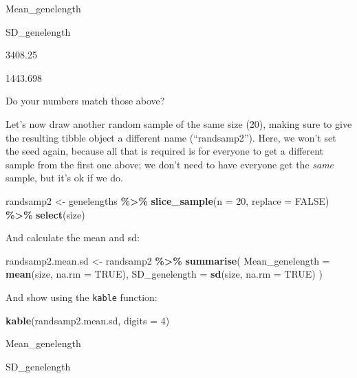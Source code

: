 \documentclass[
]{book}
\newenvironment{Shaded}{\begin{snugshade}}{\end{snugshade}}
\newcommand{\AttributeTok}[1]{\textcolor[rgb]{0.13,0.29,0.53}{#1}}
\newcommand{\ConstantTok}[1]{\textcolor[rgb]{0.56,0.35,0.01}{#1}}
\newcommand{\DecValTok}[1]{\textcolor[rgb]{0.00,0.00,0.81}{#1}}
\newcommand{\FunctionTok}[1]{\textcolor[rgb]{0.13,0.29,0.53}{\textbf{#1}}}
\newcommand{\NormalTok}[1]{#1}
\newcommand{\OtherTok}[1]{\textcolor[rgb]{0.56,0.35,0.01}{#1}}
\newcommand{\SpecialCharTok}[1]{\textcolor[rgb]{0.81,0.36,0.00}{\textbf{#1}}}
\begin{document}
Mean\_genelength

SD\_genelength

3408.25

1443.698

Do your numbers match those above?

Let's now draw another random sample of the same size (20), making sure to give the resulting tibble object a different name (``randsamp2''). Here, we won't set the seed again, because all that is required is for everyone to get a different sample from the first one above; we don't need to have everyone get the \emph{same} sample, but it's ok if we do.

\begin{Shaded}
\begin{Highlighting}[]
\NormalTok{randsamp2 }\OtherTok{\textless{}{-}}\NormalTok{ genelengths }\SpecialCharTok{\%\textgreater{}\%}
  \FunctionTok{slice\_sample}\NormalTok{(}\AttributeTok{n =} \DecValTok{20}\NormalTok{, }\AttributeTok{replace =} \ConstantTok{FALSE}\NormalTok{) }\SpecialCharTok{\%\textgreater{}\%}
  \FunctionTok{select}\NormalTok{(size)}
\end{Highlighting}
\end{Shaded}

And calculate the mean and sd:

\begin{Shaded}
\begin{Highlighting}[]
\NormalTok{randsamp2.mean.sd }\OtherTok{\textless{}{-}}\NormalTok{ randsamp2 }\SpecialCharTok{\%\textgreater{}\%}
  \FunctionTok{summarise}\NormalTok{(}
    \AttributeTok{Mean\_genelength =} \FunctionTok{mean}\NormalTok{(size, }\AttributeTok{na.rm =} \ConstantTok{TRUE}\NormalTok{),}
    \AttributeTok{SD\_genelength =} \FunctionTok{sd}\NormalTok{(size, }\AttributeTok{na.rm =} \ConstantTok{TRUE}\NormalTok{)}
\NormalTok{  )}
\end{Highlighting}
\end{Shaded}

And show using the \texttt{kable} function:

\begin{Shaded}
\begin{Highlighting}[]
\FunctionTok{kable}\NormalTok{(randsamp2.mean.sd, }\AttributeTok{digits =} \DecValTok{4}\NormalTok{)}
\end{Highlighting}
\end{Shaded}

Mean\_genelength

SD\_genelength
\end{document}
